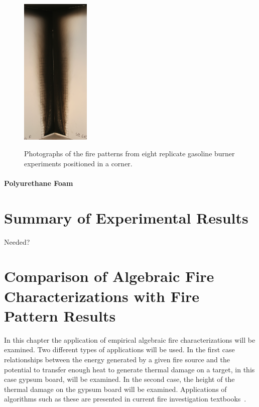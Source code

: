 \documentclass[twoside]{uocthesis}
\begin{document}
\begin{figure}[p]
	\includegraphics[width=1.3in]{../Figures/GBGas10C_IMG_9818} \\

	\caption[Photographs of the fire patterns from eight replicate gasoline burner experiments positioned in a corner]{Photographs of the fire patterns from eight replicate gasoline burner experiments positioned in a corner.}
	\label{Gas_Corner}
\end{figure}





\subsubsection{Polyurethane Foam}

\chapter{Summary of Experimental Results}

Needed?








{}
\chapter{Comparison of Algebraic Fire Characterizations with Fire Pattern Results}

In this chapter the application of empirical algebraic fire characterizations will be examined. Two different types of applications will be used.  In the first case relationships between the energy generated by a given fire source and the potential to transfer enough heat to generate thermal damage on a target, in this case gypsum board, will be examined.  In the second case, the height of the thermal damage on the gypsum board will be examined. Applications of algorithms such as these are presented in current fire investigation textbooks~\cite{Icove:2013}. 
\end{document}
